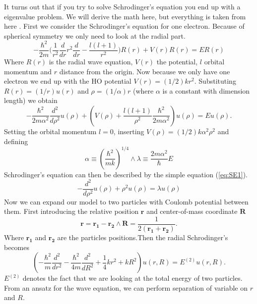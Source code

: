 \documentclass[reprint,english,notitlepage,nofootinbib]{revtex4-1}  %
\begin{document}
It turns out that if you try to solve Schrodinger's equation you end up with a eigenvalue problem. We will derive the math here, but everything is taken from here \citep{oppgavetekst}. First we consider the Schrodinger's equation for one electron. Because of spherical symmetry we only need to look at the radial part.
\begin{equation}
	-\frac{\hbar^2}{2m}\bigg(\frac{1}{r^2}\frac{d}{dr}r^2\frac{d}{dr}-\frac{l(l+1)}{r^2}\bigg)R(r) + V(r) R(r) = ER(r)
	\label{eq:SE}
\end{equation}
Where $R(r)$ is the radial wave equation, $V(r)$ the potential, $l$ orbital momentum and $r$ distance from the origin. Now because we only have one electron we end up with the HO potential $V(r) = (1/2)kr^2$. Substituting $R(r) = (1/r)u(r)$ and $\rho = (1/\alpha)r$ (where $\alpha$ is a constant with dimension length) we obtain
\begin{equation*}
	-\frac{\hbar^2}{2m\alpha^2}\frac{d^2}{d\rho^2}u(\rho) + \left(V(\rho) + \frac{l(l+1)}{\rho^2}\frac{\hbar^2}{2m\alpha^2}\right)u(\rho) = Eu(\rho).
\end{equation*}
Setting the orbital momentum $l=0$, inserting $V(\rho) = (1/2)k\alpha^2\rho^2$ and defining
\begin{equation*}
	\alpha \equiv \left(\frac{\hbar^2}{mk}\right)^{1/4} \wedge \lambda \equiv \frac{2m\alpha^2}{\hbar}E
\end{equation*}
Schrodinger's equation can then be described by the simple equation (\ref{eq:SE1}).
\begin{equation}
	-\frac{d^2}{d\rho^2}u(\rho)+\rho^2u(\rho) = \lambda u(\rho)
	\label{eq:SE1}
\end{equation}
Now we can expand our model to two particles with Coulomb potential between them. First introducing the relative position $\mathbf{r}$ and center-of-mass coordinate $\mathbf{R}$
\begin{equation*}
	\mathbf{r} = \mathbf{r_1} - \mathbf{r_2} \wedge \mathbf{R} = \frac{1}{2(\mathbf{r_1}+\mathbf{r_2})}.
\end{equation*}
Where $\mathbf{r_1}$ and $\mathbf{r_2}$ are the particles positions.Then the radial Schrodinger's becomes
\begin{equation*}
	\left(  -\frac{\hbar^2}{m} \frac{d^2}{dr^2} -\frac{\hbar^2}{4 m} \frac{d^2}{dR^2}+ \frac{1}{4} k r^2+  kR^2\right)u(r,R)  = E^{(2)} u(r,R).
\end{equation*}
$E^{(2)}$ denotes the fact that we are looking at the total energy of two particles. From an ansatz for the wave equation, we can perform separation of variable on $r$ and $R$.
\end{document}
